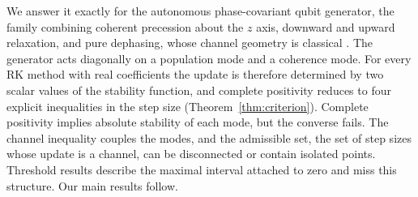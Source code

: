 \documentclass[pdflatex,sn-mathphys-num]{sn-jnl}
\theoremstyle{thmstyleone}
\theoremstyle{thmstylethree}
\theoremstyle{thmstyletwo}
\begin{document}
We answer it exactly for the autonomous phase-covariant qubit generator, the family combining coherent precession about the $z$ axis, downward and upward relaxation, and pure dephasing, whose channel geometry is classical \cite{RuskaiSzarekWerner2002,Filippov2020Phase,Siudzinska2023Geometry}. The generator acts diagonally on a population mode and a coherence mode. For every RK method with real coefficients the update is therefore determined by two scalar values of the stability function, and complete positivity reduces to four explicit inequalities in the step size (Theorem~\ref{thm:criterion}). Complete positivity implies absolute stability of each mode, but the converse fails. The channel inequality couples the modes, and the admissible set, the set of step sizes whose update is a channel, can be disconnected or contain isolated points. Threshold results \mbox{\cite{BolleyCrouzeix1978,Kraaijevanger1991Contractivity,Horvath2005Threshold}} describe the maximal interval attached to zero and miss this structure. Our main results follow.
\end{document}
